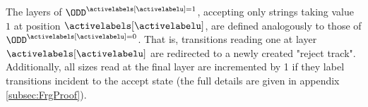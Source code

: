 
The layers of $\ODD^{\activelabels[\activelabelu]=1}$, accepting only strings taking value $1$ at position $\activelabels[\activelabelu]$, are defined analogously to those of $\ODD^{\activelabels[\activelabelu]=0}$. That is, transitions reading one at layer $\activelabels[\activelabelu]$ are redirected to a newly created "reject track". Additionally, all sizes read at the final layer are incremented by 1 if they label transitions incident to the accept state (the full details are given in appendix \ref{subsec:FrgProof}).  



